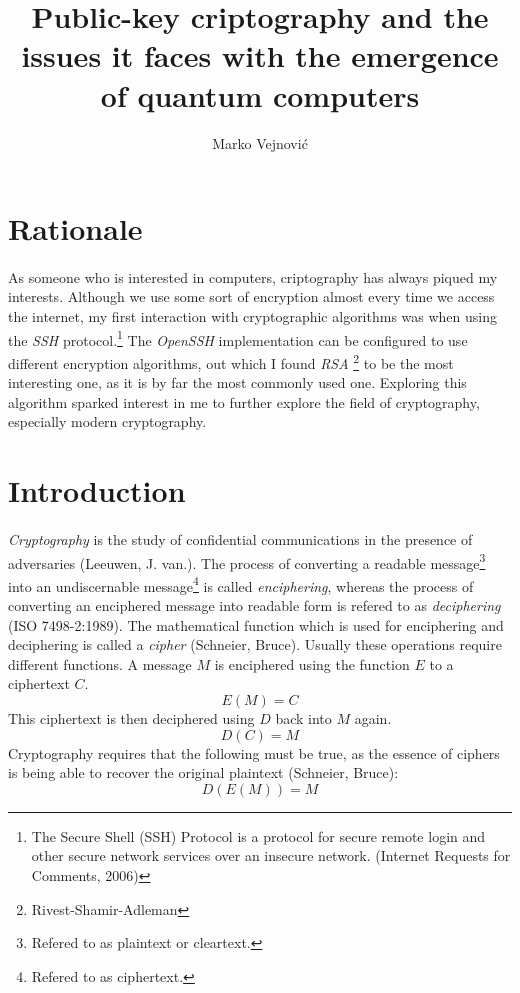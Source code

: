 \documentclass[a4paper, 12pt]{article}
\begin{document}
\title{Public-key criptography and the issues it faces with the emergence of quantum computers}
\author{Marko Vejnovi\'{c}}
\maketitle

\section{Rationale}
\paragraph*{}
As someone who is interested in computers, criptography has always piqued my interests. Although we use some sort of 
encryption almost every time we access the internet, my first interaction with cryptographic algorithms was when using 
the \textit{SSH} protocol.\footnote{The Secure Shell (SSH) Protocol is a protocol for secure remote login and other
secure network services over an insecure network. (Internet Requests for Comments, 2006)} The \textit{OpenSSH}
implementation can be configured to use different encryption algorithms, out which I found \textit{RSA}
\footnote{Rivest-Shamir-Adleman} to be the most interesting one, as it is by far the most commonly used one. Exploring
this algorithm sparked interest in me to further explore the field of cryptography, especially modern cryptography.

\section{Introduction}
\paragraph*{}
\textit{Cryptography} is the study of confidential communications in the presence of adversaries (Leeuwen, J. van.). 
The process of converting a readable message\footnote{Refered to as plaintext or cleartext.} into an undiscernable 
message\footnote{Refered to as ciphertext.} is called \textit{enciphering}, whereas the process of converting an 
enciphered message into readable form is refered to as \textit{deciphering} (ISO 7498-2:1989). The mathematical 
function which is used for enciphering and deciphering is called a \textit{cipher} (Schneier, Bruce). Usually these 
operations require different functions. A message $M$ is enciphered using the function $E$ to a ciphertext $C$.
$$E(M) = C$$
This ciphertext is then deciphered using $D$ back into $M$ again.
$$D(C) = M$$
Cryptography requires that the following must be true, as the essence of ciphers is being able to recover the original
plaintext (Schneier, Bruce):
$$D(E(M)) = M$$
\end{document}
